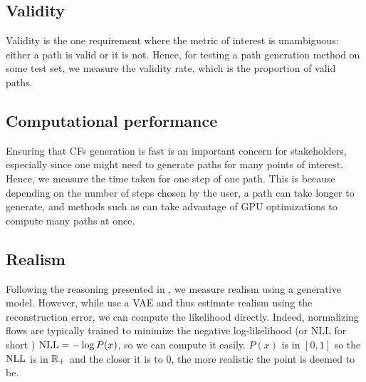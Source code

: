 \documentclass[../main.tex]{subfiles}
\begin{document}
\subsection{Validity}

Validity is the one requirement where the metric of interest is unambiguous: either a path is valid or it is not.
Hence, for testing a path generation method on some test set, we measure the validity rate, which is the proportion of valid paths.

\subsection{Computational performance}

Ensuring that CFs generation is fast is an important concern for stakeholders, especially since one might need to generate paths for many points of interest.
Hence, we measure the time taken for one step of one path.
This is because depending on the number of steps chosen by the user, a path can take longer to generate, and methods such as \ls{} can take advantage of GPU optimizations to compute many paths at once.

\subsection{Realism}




Following the reasoning presented in \cite{vanlooverenInterpretable2021}, we measure realism using a generative model.
However, while \citeauthor{vanlooverenInterpretable2021} use a VAE and thus estimate realism using the reconstruction error, we can compute the likelihood directly.
Indeed, normalizing flows are typically trained to minimize the negative log-likelihood (or NLL for short ) $\text{NLL} = - \log P(x)$, so we can compute it easily.
$P(x)$ is in $[0, 1]$ so the $\text{NLL}$ is in $\mathbb{R}_+$ and the closer it is to 0, the more realistic the point is deemed to be.


\end{document}
